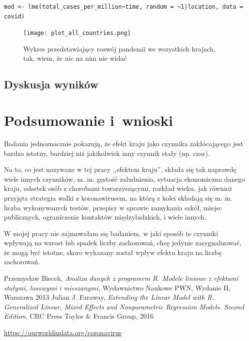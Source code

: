 \documentclass[12pt]{mwbk}
\theoremstyle{plain}
\theoremstyle{definition}
\theoremstyle{remark}
\newcommand\zrodlo[1]{\par\vspace{-3mm}{\small\textit{Źródło: }#1 }}
\begin{document}
\begin{verbatim}
mod <- lme(total_cases_per_million~time, random = ~1|location, data = covid)
\end{verbatim}

\begin{figure}[htbp]
	\centering
	\texttt{[image: plot\_all\_countries.png]}
	\caption{Wykres przedstawiający rozwój pandemii we wszystkich krajach, tak, wiem, że nic na nim nie widać}
	\label{fig:plot_all}
	\zrodlo{Opracowanie własne}
\end{figure}


\section{Dyskusja wyników}



\chapter*{Podsumowanie i~wnioski}

Badania jednoznacznie pokazują, że efekt kraju jako czynnika zakłócającego jest bardzo istotny, bardziej niż jakikolwiek inny czynnik stały (np. czas).

Na to, co jest nazywane w tej pracy ,,efektem kraju'', składa się tak naprawdę wiele innych czynników, m. in. gęstość zaludnienia, sytuacja ekonomiczna danego kraju, odsetek osób z chorobami towarzyszącymi, rozkład wieku, jak również przyjęta strategia walki z koronawirusem, na którą z kolei składają się m. in. liczba wykonywanych testów, przepisy w sprawie zamykania szkół, miejsc publicznych, ograniczenie kontaktów międzyludzkich, i wiele innych.

W mojej pracy nie zajmowałam się badaniem, w jaki sposób te czynniki wpływają na wzrost lub spadek liczby zachorowań, chcę jedynie zasygnalizować, że mogą być istotne, skoro wykazany został wpływ efektu kraju na liczbę zachorowań.

\begin{thebibliography}{99}

 Przemysław Biecek, \emph{Analiza danych z programem R. Modele liniowe z efektami stałymi, losowymi i mieszanymi}, Wydawnictwo Naukowe PWN, Wydanie II, Warszawa 2013
 Julian J. Faraway, \emph{Extending the Linear Model with R. Generalized Linear, Mixed Effects and Nonparametric Regression Models. Second Edition}, CRC Press Taylor \& Francis  Group, 2016

 \url{https://ourworldindata.org/coronavirus}

\end{thebibliography}
\end{document}
